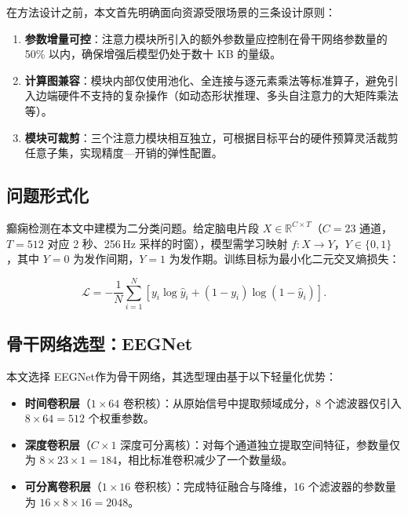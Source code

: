 \documentclass[12pt, a4paper]{article}
\begin{document}
在方法设计之前，本文首先明确面向资源受限场景的三条设计原则：

\begin{enumerate}[label=(\arabic*), leftmargin=2.2em]
\item \textbf{参数增量可控}：注意力模块所引入的额外参数量应控制在骨干网络参数量的 50\% 以内，确保增强后模型仍处于数十 KB 的量级。
\item \textbf{计算图兼容}：模块内部仅使用池化、全连接与逐元素乘法等标准算子，避免引入边端硬件不支持的复杂操作（如动态形状推理、多头自注意力的大矩阵乘法等）。
\item \textbf{模块可裁剪}：三个注意力模块相互独立，可根据目标平台的硬件预算灵活裁剪任意子集，实现精度—开销的弹性配置。
\end{enumerate}

\subsection{问题形式化}

癫痫检测在本文中建模为二分类问题。给定脑电片段 $X \in \mathbb{R}^{C \times T}$（$C = 23$ 通道，$T = 512$ 对应 2 秒、256\,Hz 采样的时窗），模型需学习映射 $f : X \rightarrow Y$，$Y \in \{0, 1\}$，其中 $Y=0$ 为发作间期，$Y=1$ 为发作期。训练目标为最小化二元交叉熵损失：

\begin{equation}
\mathcal{L} = -\frac{1}{N}\sum_{i=1}^{N}\left[y_i \log \hat{y}_i + (1 - y_i)\log(1 - \hat{y}_i)\right].
\end{equation}

\subsection{骨干网络选型：EEGNet}

本文选择 EEGNet\cite{ref_lawhern2018}作为骨干网络，其选型理由基于以下轻量化优势：

\begin{itemize}[leftmargin=2.2em]
\item \textbf{时间卷积层}（$1 \times 64$ 卷积核）：从原始信号中提取频域成分，8 个滤波器仅引入 $8 \times 64 = 512$ 个权重参数。
\item \textbf{深度卷积层}（$C \times 1$ 深度可分离核\cite{ref_howard2017}）：对每个通道独立提取空间特征，参数量仅为 $8 \times 23 \times 1 = 184$，相比标准卷积减少了一个数量级。
\item \textbf{可分离卷积层}（$1 \times 16$ 卷积核）：完成特征融合与降维，16 个滤波器的参数量为 $16 \times 8 \times 16 = 2048$。
\end{itemize}
\end{document}

